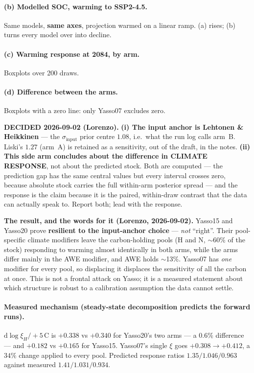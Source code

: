 \documentclass[11pt]{article}
\newcommand{\sinput}{\sigma_{\mathrm{input}}}
\begin{document}
\paragraph{(b) Modelled SOC, warming to SSP2-4.5.} Same models, \textbf{same axes}, projection
warmed on a linear ramp. (a) rises; (b) turns every model over into decline.
\paragraph{(c) Warming response at 2084, by arm.} Boxplots over 200 draws.
\paragraph{(d) Difference between the arms.} Boxplots with a zero line: only Yasso07 excludes zero.

\begin{note}
\textbf{DECIDED 2026-09-02 (Lorenzo).} \textbf{(i) The input anchor is Lehtonen \&
Heikkinen} --- the $\sinput$ prior centre $1.08$, i.e.\ what the run log calls arm~B. Liski's
$1.27$ (arm~A) is retained as a sensitivity, out of the draft, in the notes.
\textbf{(ii) This side arm concludes about the difference in CLIMATE RESPONSE}, not about the
predicted stock. Both are computed --- the prediction gap has the same central values but every
interval crosses zero, because absolute stock carries the full within-arm posterior spread --- and
the response is the claim because it is the paired, within-draw contrast that the data can actually
speak to. Report both; lead with the response.
\end{note}

\begin{note}
\textbf{The result, and the words for it (Lorenzo, 2026-09-02).} Yasso15 and Yasso20 prove
\textbf{resilient to the input-anchor choice} --- \emph{not} ``right''. Their pool-specific climate
modifiers leave the carbon-holding pools (H and N, $\sim$60\% of the stock) responding to warming
almost identically in both arms, while the arms differ mainly in the AWE modifier, and AWE holds
$\sim$13\%. Yasso07 has \emph{one} modifier for every pool, so displacing it displaces the
sensitivity of all the carbon at once. This is not a frontal attack on Yasso; it is a measured
statement about which structure is robust to a calibration assumption the data cannot settle.
\end{note}

\paragraph{Measured mechanism (steady-state decomposition predicts the forward runs).}
$\mathrm{d}\log\xi_H/{+}5$\,\textdegree C is $+0.338$ vs $+0.340$ for Yasso20's two arms --- a
$0.6\%$ difference --- and $+0.182$ vs $+0.165$ for Yasso15. Yasso07's single $\xi$ goes
$+0.308 \to +0.412$, a $34\%$ change applied to every pool. Predicted response ratios
$1.35 / 1.046 / 0.963$ against measured $1.41 / 1.031 / 0.934$.
\end{document}

